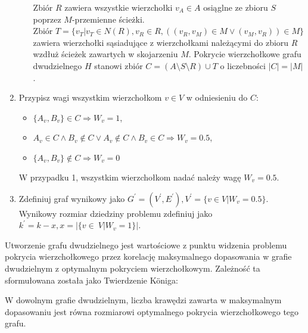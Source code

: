 \begin{enumerate}
\begin{itemize}
        Zbiór $R$ zawiera wszystkie wierzchołki $v_A \in A$ osiąglne ze zbioru $S$ poprzez $M$-przemienne ścieżki. \\
        Zbiór $T=\{v_T|v_T \in N(R), v_R \in R, ((v_R,v_M) \in M \lor (v_M,v_R)) \in M\}$ zawiera wierzchołki sąsiadujące z wierzchołkami należącymi do zbioru $R$ wzdłuż ścieżek zawartych w skojarzeniu $M$.
        Pokrycie wierzchołkowe grafu dwudzielnego $H$ stanowi zbiór $C=(A \setminus S \setminus R) \cup T$ o liczebności $|C|=|M|$.
    \end{itemize}
  \item Przypisz wagi wszystkim wierzchołkom $v \in V$ w odniesieniu do $C$:
    \begin{itemize}
      \item $\{A_v, B_v\} \in C \Rightarrow W_v=1$,
      \item $A_v \in C \land B_v \notin C \lor A_v \notin C \land B_v \in
        C \Rightarrow W_v=0.5$,
      \item $\{A_v, B_v\} \notin C \Rightarrow W_v=0$
    \end{itemize}
    W przypadku 1, wszystkim wierzchołkom nadać należy wagę $W_v=0.5$.
  \item Zdefiniuj graf wynikowy jako 
    $G^\prime=(V^\prime, E^\prime), V^\prime=\{v \in V|W_v=0.5\}$.
    Wynikowy rozmiar dziedziny problemu zdefiniuj jako 
    ${k^\prime=k-x, x=|\{v\in~V|W_v=1\}}|$.
\end{enumerate}

Utworzenie grafu dwudzielnego jest wartościowe z punktu widzenia problemu
pokrycia wierzchołkowego przez korelację maksymalnego dopasowania w grafie
dwudzielnym z optymalnym pokryciem wierzchołkowym. 
Zależność ta sformułowana została jako Twierdzenie K\"oniga:

\begin{theorem}
  W dowolnym grafie dwudzielnym, liczba krawędzi zawarta w maksymalnym
  dopasowaniu jest równa rozmiarowi optymalnego pokrycia wierzchołkowego tego
  grafu.
\end{theorem}


